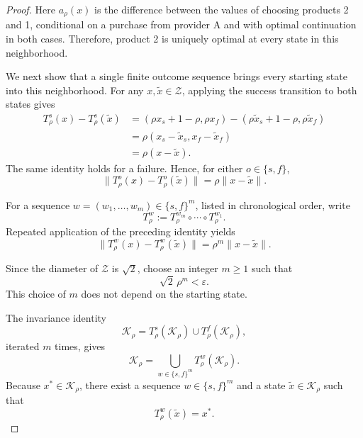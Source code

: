 \documentclass[11pt]{article}
\begin{document}
\begin{proof}
Here $a_\rho(x)$ is the difference between the values of choosing
products 2 and 1, conditional on a purchase from provider A and
with optimal continuation in both cases.
Therefore, product 2 is uniquely optimal at every state in this
neighborhood.

We next show that a single finite outcome sequence brings every
starting state into this neighborhood. For any
$x,\widetilde x\in\mathcal Z$, applying the success transition
to both states gives
\begin{equation*}
\begin{aligned}
T_\rho^s(x)-T_\rho^s(\widetilde x)
&=(\rho x_s+1-\rho,\rho x_f)
 -(\rho\widetilde x_s+1-\rho,\rho\widetilde x_f)\\
&=\rho(x_s-\widetilde x_s,x_f-\widetilde x_f)\\
&=\rho(x-\widetilde x).
\end{aligned}
\end{equation*}
The same identity holds for a failure.
Hence, for either $o\in\{s,f\}$,
\begin{equation*}
\|T_\rho^o(x)-T_\rho^o(\widetilde x)\|
=\rho\|x-\widetilde x\|.
\end{equation*}

For a sequence $w=(w_1,\ldots,w_m)\in\{s,f\}^m$,
listed in chronological order, write
\begin{equation*}
T_\rho^w
:=T_\rho^{w_m}\circ\cdots\circ T_\rho^{w_1}.
\end{equation*}
Repeated application of the preceding identity yields
\begin{equation}
\label{eq:pers-contraction}
\|T_\rho^w(x)-T_\rho^w(\widetilde x)\|
=\rho^m\|x-\widetilde x\|.
\end{equation}

Since the diameter of $\mathcal Z$ is $\sqrt{2}$,
choose an integer $m\ge1$ such that
\begin{equation*}
\sqrt{2}\,\rho^m<\varepsilon.
\end{equation*}
This choice of $m$ does not depend on the starting state.

The invariance identity
\begin{equation*}
\mathcal K_\rho
=T_\rho^s(\mathcal K_\rho)\cup T_\rho^f(\mathcal K_\rho),
\end{equation*}
iterated $m$ times, gives
\begin{equation*}
\mathcal K_\rho
=\bigcup_{w\in\{s,f\}^m}T_\rho^w(\mathcal K_\rho).
\end{equation*}
Because $x^*\in\mathcal K_\rho$, there exist a sequence
$w\in\{s,f\}^m$ and a state
$\widetilde x\in\mathcal K_\rho$ such that
\begin{equation*}
T_\rho^w(\widetilde x)=x^*.
\end{equation*}


\end{proof}
\end{document}
